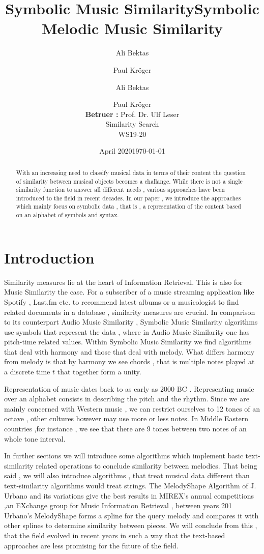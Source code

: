 \documentclass{llncs}
\title{Symbolic Music Similarity}
\author{Ali Bektas \and Paul Kröger}
\date{April 2020}
\title{Symbolic Melodic Music Similarity}
\author{Ali Bektas \and Paul Kröger \\ \textbf{Betruer :} Prof. Dr. Ulf Leser \\ Similarity Search \\ WS19-20}
\date{\today}
\institute{ \vspace{5px} 
  	Humboldt Universität zu Berlin\\}
\begin{document}
	 
	\mainmatter

	
	\maketitle


	\begin{abstract}
	With an increasing need to classify musical data in terms of their content 
	the question of similarity between musical objects becomes a challange. While 
	there is not a single similarity function to answer all different needs , various approaches
	have been introduced to the field in recent decades. In our paper , we introduce the approaches
	which mainly focus on symbolic data , that is , a representation of the content based on an alphabet
	of symbols and syntax.
	\end{abstract}

	\section{Introduction}
		Similarity measures lie at the heart of Information Retrieval. This is also for Music Similarity the case. For a subscriber of a music streaming application like Spotify , Last.fm etc. to recommend latest albums or a musicologist to find related documents in a database , similarity measures are crucial. In comparison to its counterpart Audio Music Similarity , Symbolic Music Similarity algorithms use symbols that represent the data , where in Audio Music Similarity one has pitch-time related values. Within Symbolic Music Similarity we find algorithms that deal with harmony and those that deal with melody. What differs harmony from melody is that by harmony we see chords , that is multiple notes played at a discrete time $t$ that together form a unity.  

		Representation of music dates back to as early as 2000 BC \cite{kil:civ}. Representing music over an alphabet consists in describing the pitch and the rhythm. Since we are mainly concerned with Western music , we can restrict ourselves to 12 tones of an octave , other cultures however may use more or less notes. In Middle Eastern countries ,for instance , we see that there are 9 tones between two notes of an whole tone interval.

		In further sections we will introduce some algorithms which implement basic text-similarity related operations to conclude similarity between melodies. That being said , we will also introduce  algorithms , that treat musical data different than text-similarity algorithms would treat  strings. The MelodyShape Algorithm of J. Urbano \cite{five_point_two}  and its variations give the best results in MIREX's annual competitions ,an EXchange group for Music Information Retrieval , between years 201
		Urbano's MelodyShape forms a spline for the query melody and compares it with other splines to determine similarity between pieces. We will conclude from this , that the field evolved in recent years in such a way that the text-based approaches are less promising for the future of the field.
\end{document}
